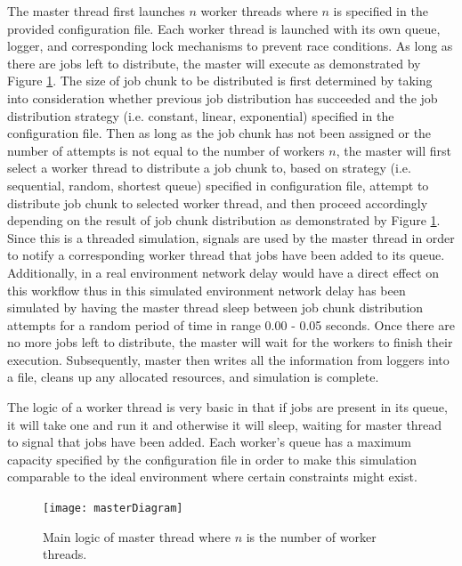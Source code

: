 \documentclass{article}
\begin{document}
The master thread first launches $n$ worker threads where $n$ is specified in the provided configuration file. Each worker thread is launched with its own queue, logger, and corresponding lock mechanisms to prevent race conditions. As long as there are jobs left to distribute, the master will execute as demonstrated by Figure \ref{masterFlow}. The size of job chunk to be distributed is first determined by taking into consideration whether previous job distribution has succeeded and the job distribution strategy (i.e. constant, linear, exponential) specified in the configuration file. Then as long as the job chunk has not been assigned or the number of attempts is not equal to the number of workers $n$, the master will first select a worker thread to distribute a job chunk to, based on strategy (i.e. sequential, random, shortest queue) specified in configuration file, attempt to distribute job chunk to selected worker thread, and then proceed accordingly depending on the result of job chunk distribution as demonstrated by Figure \ref{masterFlow}. Since this is a threaded simulation, signals are used by the master thread in order to notify a corresponding worker thread that jobs have been added to its queue. Additionally, in a real environment network delay would have a direct effect on this workflow thus in this simulated environment network delay has been simulated by having the master thread sleep between job chunk distribution attempts for a random period of time in range 0.00 - 0.05 seconds. Once there are no more jobs left to distribute, the master will wait for the workers to finish their execution. Subsequently, master then writes all the information from loggers into a file, cleans up any allocated resources, and simulation is complete.

The logic of a worker thread is very basic in that if jobs are present in its queue, it will take one and run it and otherwise it will sleep, waiting for master thread to signal that jobs have been added. Each worker's queue has a maximum capacity specified by the configuration file in order to make this simulation comparable to the ideal environment where certain constraints might exist.

\begin{figure}[p]
\centering
\texttt{[image: masterDiagram]}
\caption{Main logic of master thread where $n$ is the number of worker threads. \label{masterFlow}}
\end{figure}


\afterpage{\clearpage}
\end{document}
